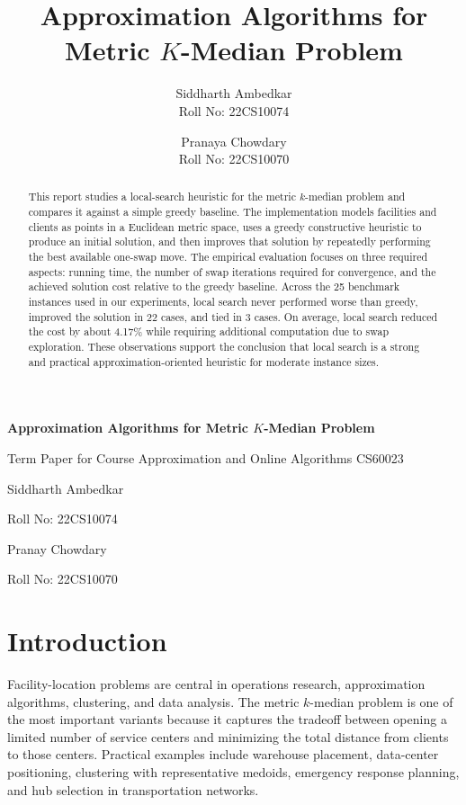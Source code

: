 \documentclass[11pt]{article}
\title{Approximation Algorithms for Metric $K$-Median Problem}
\author{
Siddharth Ambedkar\\
Roll No: 22CS10074
\and
Pranaya Chowdary\\
Roll No: 22CS10070
}
\date{}
\begin{document}
\begin{titlepage}
    \centering
    \vspace*{2.5cm}
    {\LARGE \textbf{Approximation Algorithms for Metric $K$-Median Problem}\par}
    \vspace{1.2cm}
    {\Large Term Paper for Course Approximation and Online Algorithms CS60023\par}
    \vspace{2cm}
    {\Large Siddharth Ambedkar\par}
    {\large Roll No: 22CS10074\par}
    \vspace{0.8cm}
    {\Large Pranay Chowdary\par}
    {\large Roll No: 22CS10070\par}
    \vfill
\end{titlepage}

\tableofcontents
\newpage

\begin{abstract}
This report studies a local-search heuristic for the metric $k$-median problem and compares it against a simple greedy baseline. The implementation models facilities and clients as points in a Euclidean metric space, uses a greedy constructive heuristic to produce an initial solution, and then improves that solution by repeatedly performing the best available one-swap move. The empirical evaluation focuses on three required aspects: running time, the number of swap iterations required for convergence, and the achieved solution cost relative to the greedy baseline. Across the 25 benchmark instances used in our experiments, local search never performed worse than greedy, improved the solution in 22 cases, and tied in 3 cases. On average, local search reduced the cost by about 4.17\% while requiring additional computation due to swap exploration. These observations support the conclusion that local search is a strong and practical approximation-oriented heuristic for moderate instance sizes.
\end{abstract}

\newpage

\section{Introduction}
Facility-location problems are central in operations research, approximation algorithms, clustering, and data analysis. The metric $k$-median problem is one of the most important variants because it captures the tradeoff between opening a limited number of service centers and minimizing the total distance from clients to those centers. Practical examples include warehouse placement, data-center positioning, clustering with representative medoids, emergency response planning, and hub selection in transportation networks.
\end{document}
